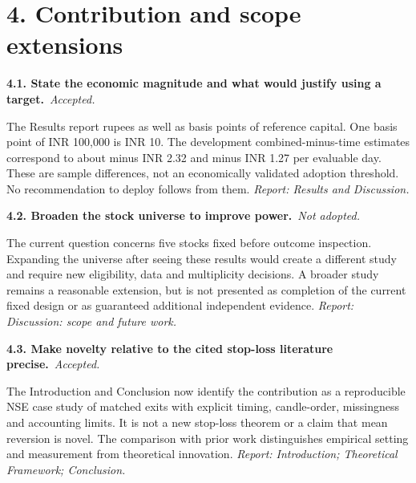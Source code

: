 \documentclass[11pt,a4paper]{article}
\newcommand{\Needspace}[1]{\par\begingroup\ifdim\dimexpr\pagegoal-\pagetotal\relax<#1\relax\newpage\fi\endgroup}
\newcommand{\reply}[3]{\par\addvspace{5pt}\noindent\textbf{#1. #2}\ \textit{#3.}\par\nobreak}
\begin{document}
\Needspace{10\baselineskip}
\section*{4. Contribution and scope extensions}
\par\noindent\begin{minipage}{\linewidth}\justifying
\reply{4.1}{State the economic magnitude and what would justify using a target.}{Accepted}
The Results report rupees as well as basis points of reference capital. One basis point of INR 100,000 is INR 10. The development combined-minus-time estimates correspond to about minus INR 2.32 and minus INR 1.27 per evaluable day. These are sample differences, not an economically validated adoption threshold. No recommendation to deploy follows from them.
{\small\textit{Report: Results and Discussion.}}
\end{minipage}\par\addvspace{5pt}

\par\noindent\begin{minipage}{\linewidth}\justifying
\reply{4.2}{Broaden the stock universe to improve power.}{Not adopted}
The current question concerns five stocks fixed before outcome inspection. Expanding the universe after seeing these results would create a different study and require new eligibility, data and multiplicity decisions. A broader study remains a reasonable extension, but is not presented as completion of the current fixed design or as guaranteed additional independent evidence.
{\small\textit{Report: Discussion: scope and future work.}}
\end{minipage}\par\addvspace{5pt}

\par\noindent\begin{minipage}{\linewidth}\justifying
\reply{4.3}{Make novelty relative to the cited stop-loss literature precise.}{Accepted}
The Introduction and Conclusion now identify the contribution as a reproducible NSE case study of matched exits with explicit timing, candle-order, missingness and accounting limits. It is not a new stop-loss theorem or a claim that mean reversion is novel. The comparison with prior work distinguishes empirical setting and measurement from theoretical innovation.
{\small\textit{Report: Introduction; Theoretical Framework; Conclusion.}}
\end{minipage}\par\addvspace{5pt}
\end{document}
